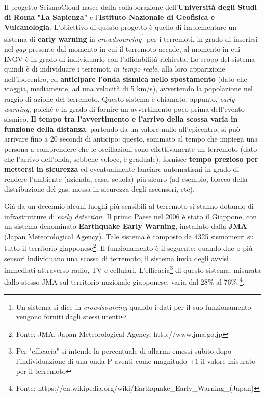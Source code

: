 \documentclass[a4paper,10pt]{memoir}
\begin{document}
Il progetto SeismoCloud nasce dalla collaborazione dell'\textbf{Università degli Studi di Roma "La Sapienza"} e l'\textbf{Istituto Nazionale di Geofisica e Vulcanologia}. L'obiettivo di questo progetto è quello di implementare un sistema di \textbf{early warning} in \textit{crowdsourcing}\footnote{Un sistema si dice in \textit{crowdsourcing} quando i dati per il suo funzionamento vengono forniti dagli stessi utenti} per i terremoti, in grado di inserirsi nel \textit{gap} presente dal momento in cui il terremoto accade, al momento in cui INGV è in grado di individuarlo con l'affidabilità richiesta. Lo scopo del sistema quindi è di individuare i terremoti \textit{in tempo reale}, alla loro apparizione nell'ipocentro, ed \textbf{anticipare l'onda sismica nello spostamento} (dato che viaggia, mediamente, ad una velocità di 5 km/s), avvertendo la popolazione nel raggio di azione del terremoto. Questo sistema è chiamato, appunto, \textit{early warning}, poiché è in grado di fornire un avvertimento poco prima dell'evento sismico. \textbf{Il tempo tra l'avvertimento e l'arrivo della scossa varia in funzione della distanza}: partendo da un valore nullo all'epicentro, si può arrivare fino a 20 secondi di anticipo: questo, sommato al tempo che impiega una persona a comprendere che le oscillazioni sono effettivamente un terremoto (dato che l'arrivo dell'onda, sebbene veloce, è graduale), fornisce \textbf{tempo prezioso per mettersi in sicurezza} ed eventualmente lanciare automatismi in grado di rendere l'ambiente (azienda, casa, scuola) più sicuro (ad esempio, blocco della distribuzione del gas, messa in sicurezza degli ascensori, etc).

Già da un decennio alcuni luoghi più sensibili al terremoto si stanno dotando di infrastrutture di \textit{early detection}. Il primo Paese nel 2006 è stato il Giappone, con un sistema denominato \textbf{Earthquake Early Warning}, installato dalla \textbf{JMA} (Japan Meteorological Agency). Tale sistema è composto da 4325 sismometri su tutto il territorio giapponese\footnote{Fonte: JMA, Japan Meteorological Agency, http://www.jma.go.jp}. Il funzionamento è il seguente: quando due o più sensori individuano una scossa di terremoto, il sistema invia degli avvisi immediati attraverso radio, TV e cellulari. L'efficacia\footnote{Per "efficacia" si intende la percentuale di allarmi emessi subito dopo l'individuazione di una onda-P aventi come magnitudo $\pm1$ il valore misurato per il terremoto} di questo sistema, misurata dallo stesso JMA sul territorio nazionale giapponese, varia dal 28\% al 76\% \footnote{Fonte: https://en.wikipedia.org/wiki/Earthquake\_Early\_Warning\_(Japan)}.
\end{document}
